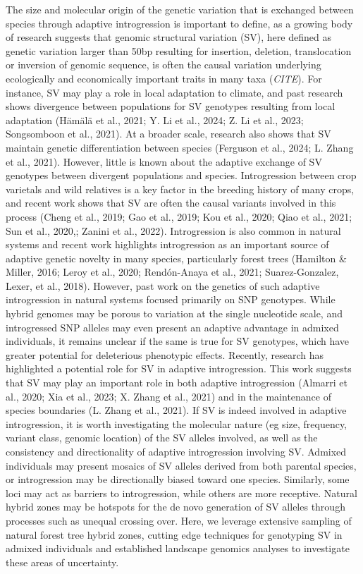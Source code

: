\documentclass[
]{agujournal2019}
\begin{document}
The size and molecular origin of the genetic variation that is exchanged
between species through adaptive introgression is important to define,
as a growing body of research suggests that genomic structural variation
(SV), here defined as genetic variation larger than 50bp resulting for
insertion, deletion, translocation or inversion of genomic sequence, is
often the causal variation underlying ecologically and economically
important traits in many taxa (\emph{CITE}). For instance, SV may play a
role in local adaptation to climate, and past research shows divergence
between populations for SV genotypes resulting from local adaptation
(Hämälä et al., 2021; Y. Li et al., 2024; Z. Li et al., 2023;
Songsomboon et al., 2021). At a broader scale, research also shows that
SV maintain genetic differentiation between species (Ferguson et al.,
2024; L. Zhang et al., 2021). However, little is known about the
adaptive exchange of SV genotypes between divergent populations and
species. Introgression between crop varietals and wild relatives is a
key factor in the breeding history of many crops, and recent work shows
that SV are often the causal variants involved in this process (Cheng et
al., 2019; Gao et al., 2019; Kou et al., 2020; Qiao et al., 2021; Sun et
al., 2020,; Zanini et al., 2022). Introgression is also common in
natural systems and recent work highlights introgression as an important
source of adaptive genetic novelty in many species, particularly forest
trees (Hamilton \& Miller, 2016; Leroy et al., 2020; Rendón-Anaya et
al., 2021; Suarez-Gonzalez, Lexer, et al., 2018). However, past work on
the genetics of such adaptive introgression in natural systems focused
primarily on SNP genotypes. While hybrid genomes may be porous to
variation at the single nucleotide scale, and introgressed SNP alleles
may even present an adaptive advantage in admixed individuals, it
remains unclear if the same is true for SV genotypes, which have greater
potential for deleterious phenotypic effects. Recently, research has
highlighted a potential role for SV in adaptive introgression. This work
suggests that SV may play an important role in both adaptive
introgression (Almarri et al., 2020; Xia et al., 2023; X. Zhang et al.,
2021) and in the maintenance of species boundaries (L. Zhang et al.,
2021). If SV is indeed involved in adaptive introgression, it is worth
investigating the molecular nature (eg size, frequency, variant class,
genomic location) of the SV alleles involved, as well as the consistency
and directionality of adaptive introgression involving SV. Admixed
individuals may present mosaics of SV alleles derived from both parental
species, or introgression may be directionally biased toward one
species. Similarly, some loci may act as barriers to introgression,
while others are more receptive. Natural hybrid zones may be hotspots
for the de novo generation of SV alleles through processes such as
unequal crossing over. Here, we leverage extensive sampling of natural
forest tree hybrid zones, cutting edge techniques for genotyping SV in
admixed individuals and established landscape genomics analyses to
investigate these areas of uncertainty.
\end{document}
